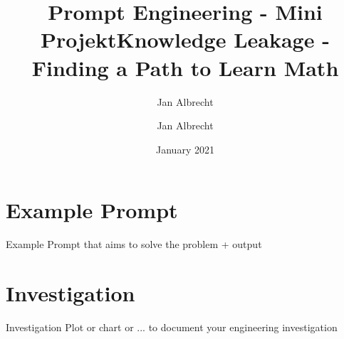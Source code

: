 \documentclass{beamer}
\title{Prompt Engineering - Mini Projekt}
\author{Jan Albrecht}
\date{January 2021}
\title[Prompt Engineering Project] %
{Knowledge Leakage - Finding a Path to Learn Math}
\author[J. Albrecht] %
{Jan Albrecht}
\institute[Student - University Leipzig] %
{University Leipzig\\[12pt]Problem Description}
\date[12.06.2022] %
\begin{document}
	\frame{\titlepage}
	\section{Example Prompt}
	\begin{frame}{Example Prompt that aims to solve the problem + output}
	\end{frame}
\section{Investigation}
\begin{frame}{Investigation}
	Plot or chart or ... to document your engineering investigation
\end{frame}
\end{document}
